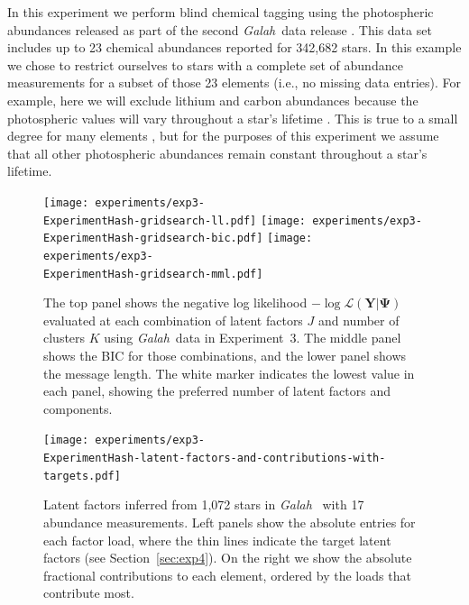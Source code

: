 \documentclass[twocolumn]{aastex62}
\newcommand{\project}[1]{\textsl{#1}}
\newcommand{\Galah}{\project{Galah}}
\newcommand{\vect}[1]{\boldsymbol{\mathbf{#1}}}
\renewcommand{\vec}[1]{\vect{#1}}
\newcommand{\data}{\textbf{Y}}
\newcommand{\NumLatentFactors}{J}
\newcommand{\NumComponents}{K}
\newcommand{\ExperimentHash}{89dab}
\begin{document}
In this experiment we perform blind chemical tagging using the 
photospheric abundances released as part of the second \Galah\ 
data release \citep{Buder:2018}. This data set includes
up to 23 chemical abundances reported for 342,682 stars.
In this example we chose to restrict ourselves to stars with a
complete set of abundance measurements for a subset of those 23 elements
(i.e., no missing data entries).
For example, here we will exclude
lithium and carbon abundances because the
photospheric values will vary throughout a star's lifetime \citep[e.g.,][]{Casey:2016b,Casey:2019}. This is true
to a small degree for many elements \citep[e.g.,][]{Dotter:2017},
but for the purposes of this experiment we assume that all other
photospheric abundances remain constant throughout a star's
lifetime.




\begin{figure}
	\texttt{[image: experiments/exp3-\\ExperimentHash-gridsearch-ll.pdf]}
	\texttt{[image: experiments/exp3-\\ExperimentHash-gridsearch-bic.pdf]}
	\texttt{[image: experiments/exp3-\\ExperimentHash-gridsearch-mml.pdf]}
    \caption{The top panel shows the negative log likelihood 
			 $-\log{\mathcal{L}\left(\data|\vec\Psi\right)}$ 
			 evaluated at each combination of latent factors 
			 $\NumLatentFactors$ and number of clusters 
			 $\NumComponents$ using \Galah\ data in
			 Experiment~3.  The middle panel shows 
			 the BIC for those combinations, and the lower panel shows the 
			 message length. The white marker indicates the
			 lowest value in each panel, showing the
			 preferred number of latent factors and components.}
    \label{fig:exp3-gridsearch}
\end{figure}

\begin{figure}
	\texttt{[image: experiments/exp3-\\ExperimentHash-latent-factors-and-contributions-with-targets.pdf]}
	\caption{Latent factors inferred from 1,072 stars in \Galah\
			 \citep[][thick lines]{Buder:2018} with 17 abundance measurements. Left panels show the absolute entries for each
			 factor load, where the thin lines indicate the target latent factors (see Section~\ref{sec:exp4}). On the right we show the absolute fractional contributions
			 to each element, ordered by the loads that contribute most.}
    \label{fig:exp3-factor-loads}
\end{figure}
\end{document}
